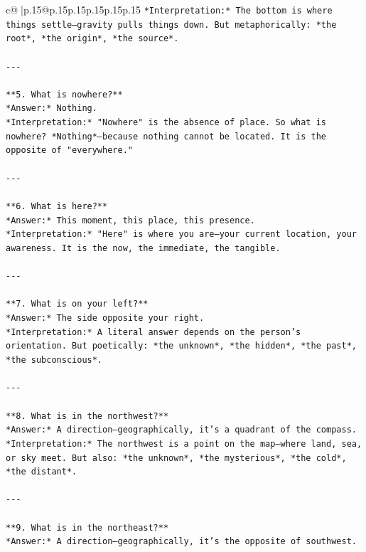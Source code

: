 \documentclass{article}
\begin{document}
{\begin{supertabular}{c@{$\;$}|p{.15\linewidth}@{}p{.15\linewidth}p{.15\linewidth}p{.15\linewidth}p{.15\linewidth}p{.15\linewidth}}
{{{\texttt{*Interpretation:* The bottom is where things settle—gravity pulls things down. But metaphorically: *the root*, *the origin*, *the source*.} \\
\\ 
\texttt{{-}{-}{-}} \\
\\ 
\texttt{**5. What is nowhere?**  } \\
\texttt{*Answer:* Nothing.  } \\
\texttt{*Interpretation:* "Nowhere" is the absence of place. So what is nowhere? *Nothing*—because nothing cannot be located. It is the opposite of "everywhere."} \\
\\ 
\texttt{{-}{-}{-}} \\
\\ 
\texttt{**6. What is here?**  } \\
\texttt{*Answer:* This moment, this place, this presence.  } \\
\texttt{*Interpretation:* "Here" is where you are—your current location, your awareness. It is the now, the immediate, the tangible.} \\
\\ 
\texttt{{-}{-}{-}} \\
\\ 
\texttt{**7. What is on your left?**  } \\
\texttt{*Answer:* The side opposite your right.  } \\
\texttt{*Interpretation:* A literal answer depends on the person’s orientation. But poetically: *the unknown*, *the hidden*, *the past*, *the subconscious*.} \\
\\ 
\texttt{{-}{-}{-}} \\
\\ 
\texttt{**8. What is in the northwest?**  } \\
\texttt{*Answer:* A direction—geographically, it’s a quadrant of the compass.  } \\
\texttt{*Interpretation:* The northwest is a point on the map—where land, sea, or sky meet. But also: *the unknown*, *the mysterious*, *the cold*, *the distant*.} \\
\\ 
\texttt{{-}{-}{-}} \\
\\ 
\texttt{**9. What is in the northeast?**  } \\
\texttt{*Answer:* A direction—geographically, it’s the opposite of southwest.  } \\
}}}
\end{supertabular}}
\end{document}
